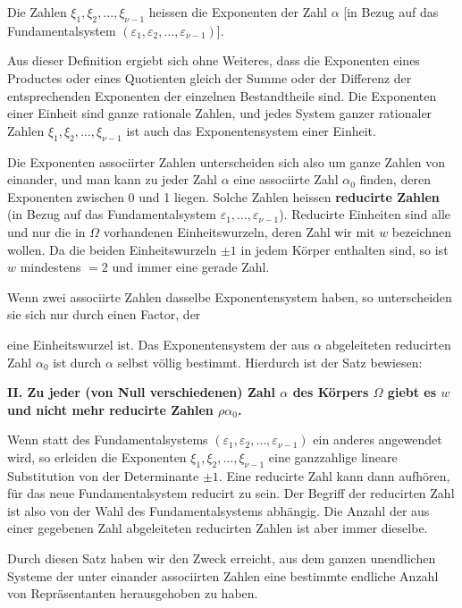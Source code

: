 \documentclass[11pt]{article}
\begin{document}
Die Zahlen $\xi_1,\xi_2,\ldots,\xi_{\nu-1}$ heissen die Exponenten der Zahl $\alpha$ [in Bezug auf das Fundamentalsystem $(\varepsilon_1,\varepsilon_2,\ldots,\varepsilon_{\nu-1})$].

Aus dieser Definition ergiebt sich ohne Weiteres, dass die Exponenten eines Productes oder eines Quotienten gleich der Summe oder der Differenz der entsprechenden Exponenten der einzelnen Bestandtheile sind. Die Exponenten einer Einheit sind ganze rationale Zahlen, und jedes System ganzer rationaler Zahlen $\xi_1,\xi_2,\ldots,\xi_{\nu-1}$ ist auch das Exponentensystem einer Einheit.

Die Exponenten associirter Zahlen unterscheiden sich also um ganze Zahlen von einander, und man kann zu jeder Zahl $\alpha$ eine associirte Zahl $\alpha_0$ finden, deren Exponenten zwischen 0 und 1 liegen. Solche Zahlen heissen \textbf{reducirte Zahlen} (in Bezug auf das Fundamentalsystem $\varepsilon_1,\ldots,\varepsilon_{\nu-1}$). Reducirte Einheiten sind alle und nur die in $\Omega$ vorhandenen Einheitswurzeln, deren Zahl wir mit $w$ bezeichnen wollen. Da die beiden Einheitswurzeln $\pm1$ in jedem Körper enthalten sind, so ist $w$ mindestens $=2$ und immer eine gerade Zahl.

Wenn zwei associirte Zahlen dasselbe Exponentensystem haben, so unterscheiden sie sich nur durch einen Factor, der

eine Einheitswurzel ist. Das Exponentensystem der aus $\alpha$ abgeleiteten reducirten Zahl $\alpha_0$ ist durch $\alpha$ selbst völlig bestimmt. Hierdurch ist der Satz bewiesen:

\begin{center}
\textbf{II. Zu jeder (von Null verschiedenen) Zahl $\alpha$ des Körpers $\Omega$ giebt es $w$ und nicht mehr reducirte Zahlen $\rho\alpha_0$.}
\end{center}

Wenn statt des Fundamentalsystems $(\varepsilon_1,\varepsilon_2,\ldots,\varepsilon_{\nu-1})$ ein anderes angewendet wird, so erleiden die Exponenten $\xi_1,\xi_2,\ldots,\xi_{\nu-1}$ eine ganzzahlige lineare Substitution von der Determinante $\pm1$. Eine reducirte Zahl kann dann aufhören, für das neue Fundamentalsystem reducirt zu sein. Der Begriff der reducirten Zahl ist also von der Wahl des Fundamentalsystems abhängig. Die Anzahl der aus einer gegebenen Zahl abgeleiteten reducirten Zahlen ist aber immer dieselbe.

Durch diesen Satz haben wir den Zweck erreicht, aus dem ganzen unendlichen Systeme der unter einander associirten Zahlen eine bestimmte endliche Anzahl von Repräsentanten herausgehoben zu haben.
\end{document}
